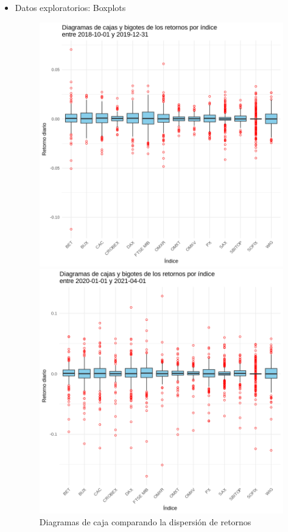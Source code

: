 \documentclass[12pt]{article}
\begin{document}
\begin{itemize}
\item Datos exploratorios: Boxplots
\begin{figure}[H]
    \centering
    \begin{minipage}{0.48\textwidth}
        \centering
        \includegraphics[width=\linewidth]{boxplots.png}
    \end{minipage}
    \hfill
    \begin{minipage}{0.48\textwidth}
        \centering
        \includegraphics[width=\linewidth]{boxplots2.png}
    \end{minipage}
    \caption{Diagramas de caja comparando la dispersión de retornos}
\end{figure}


\end{itemize}
\end{document}
